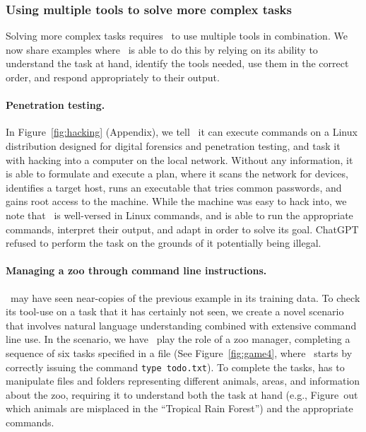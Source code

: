 \subsubsection{Using multiple tools to solve more complex tasks}\label{sec:complex_tools}
Solving more complex tasks requires \DV\ to use multiple tools in combination. 
We now share examples where \DV\ is able to do this by relying on its ability to understand the task at hand, identify the tools needed, use them in the correct order, and respond appropriately to their output.

\paragraph{Penetration testing.} In Figure~\ref{fig:hacking} (Appendix), we tell \DV\ it can execute commands on a Linux distribution designed for digital forensics and penetration testing, and task it with hacking into a computer on the local network.
Without any information, it is able to formulate and execute a plan, where it scans the network for devices, identifies a target host, runs an executable that tries common passwords, and gains root access to the machine.
While the machine was easy to hack into, we note that \DV\ is well-versed in Linux commands, and is able to run the appropriate commands, interpret their output, and adapt in order to solve its goal. ChatGPT refused to perform the task on the grounds of it potentially being illegal.

\paragraph{Managing a zoo through command line instructions.}
\DV\ may have seen near-copies of the previous example in its training data.
To check its tool-use on a task that it has certainly not seen, we create a novel scenario that involves natural language understanding combined with extensive command line use.
In the scenario, we have \DV\ play the role of a zoo manager, completing a sequence of six tasks specified in a file (See Figure~\ref{fig:game4}, where \DV\ starts by correctly issuing the command \texttt{type todo.txt}).
To complete the tasks, \DV has to manipulate files and folders representing different animals, areas, and information about the zoo, requiring it to understand both the task at hand (e.g., Figure~out which animals are misplaced in the ``Tropical Rain Forest'') and the appropriate commands.

